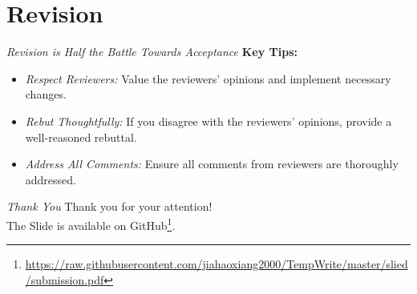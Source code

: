 \documentclass{beamer}
\begin{document}
\section{Revision}

\begin{frame}{\textit{Revision is Half the Battle Towards Acceptance}}
    \textbf{Key Tips:}
    \begin{itemize}
        \item \textit{Respect Reviewers:} Value the reviewers' opinions and implement necessary changes.
        \item \textit{Rebut Thoughtfully:} If you disagree with the reviewers' opinions, provide a well-reasoned rebuttal.
        \item \textit{Address All Comments:} Ensure all comments from reviewers are thoroughly addressed.
    \end{itemize}
\end{frame}


\begin{frame}{\textit{Thank You}}
    \centering
    \Large
    Thank you for your attention! \\
    \normalsize
    The Slide is available on GitHub{\footnotesize\footnote{\url{https://raw.githubusercontent.com/jiahaoxiang2000/TempWrite/master/slied/submission.pdf}}}.
\end{frame}
\end{document}
